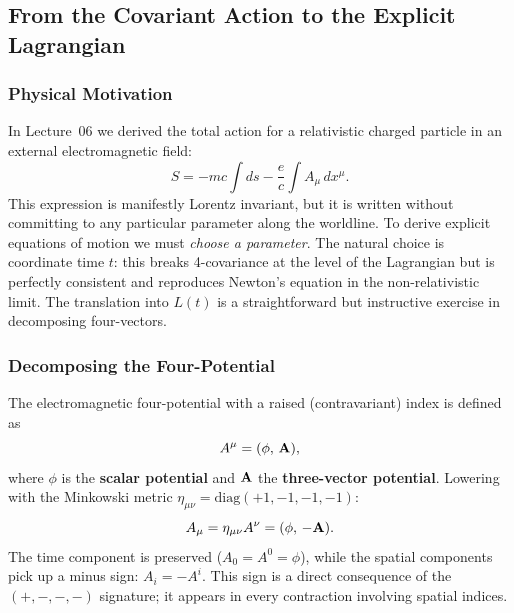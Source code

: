 \subsection{From the Covariant Action to the Explicit Lagrangian}\label{sec:lec07:lagrangian}

\subsubsection*{Physical Motivation}

In Lecture~06 we derived the total action for a relativistic charged particle
in an external electromagnetic field:
\begin{equation}\label{eq:lec07:total-action}
    S = -mc\int ds - \frac{e}{c}\int A_\mu\,dx^\mu .
\end{equation}
This expression is manifestly Lorentz invariant, but it is written without
committing to any particular parameter along the worldline.  To derive explicit
equations of motion we must \emph{choose a parameter}.  The natural choice is
coordinate time $t$: this breaks 4-covariance at the level of the Lagrangian
but is perfectly consistent and reproduces Newton's equation in the
non-relativistic limit.  The translation into $L(t)$ is a straightforward
but instructive exercise in decomposing four-vectors.

\subsubsection*{Decomposing the Four-Potential}

The electromagnetic four-potential with a raised (contravariant) index is
defined as
\begin{equation}\label{eq:lec07:fourpot-upper}
    A^\mu = (\phi,\,\mathbf{A}),
\end{equation}
where $\phi$ is the \textbf{scalar potential} and $\mathbf{A}$ the
\textbf{three-vector potential}.  Lowering with the Minkowski metric
$\eta_{\mu\nu} = \mathrm{diag}(+1,-1,-1,-1)$:
\begin{equation}\label{eq:lec07:fourpot-lower}
    A_\mu = \eta_{\mu\nu}A^\nu
    = (\phi,\,-\mathbf{A}).
\end{equation}
The time component is preserved ($A_0 = A^0 = \phi$), while the spatial
components pick up a minus sign: $A_i = -A^i$.  This sign is a direct
consequence of the $(+,-,-,-)$ signature; it appears in every contraction
involving spatial indices.

